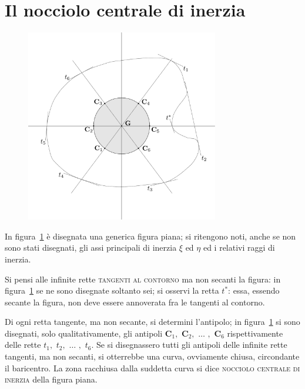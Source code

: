 \section{Il nocciolo centrale di inerzia}
\renewcommand{\thefigure}{6~-~5}
\begin{figure}[ht]
\centering
\includegraphics[width=0.75\textwidth]{Immagini/Parte_6/Figura6_5/Figura6_5.pdf}
\caption{}
\label{figura6-5}
\end{figure}
\noindent In figura~\ref{figura6-5} è disegnata una generica figura piana; si ritengono noti, anche se non sono stati disegnati, gli assi principali di inerzia $\xi$ ed $\eta$ ed i relativi raggi di inerzia. 

\noindent Si pensi alle infinite rette \textsc{tangenti al contorno} ma non secanti la figura: in figura~\ref{figura6-5} se ne sono disegnate soltanto sei; si osservi la retta $t^{*}$: essa, essendo secante la figura, non deve essere annoverata fra le tangenti al contorno.

\noindent Di ogni retta tangente, ma non secante, si determini l'antipolo; in figura~\ref{figura6-5} si sono disegnati, solo qualitativamente, gli antipoli $\mathbf{C}_{1},\,\,\mathbf{C}_{2},\,\,\dots\,\,,\,\,\mathbf{C}_{6}$ rispettivamente delle rette $t_{1},\,\,t_{2},\,\,\dots\,\,,\,\,t_{6}$. Se si disegnassero tutti gli antipoli delle infinite rette tangenti, ma non secanti, si otterrebbe una curva, ovviamente chiusa, circondante il baricentro. La zona racchiusa dalla suddetta curva si dice \textsc{nocciolo centrale di inerzia} della figura piana. 

